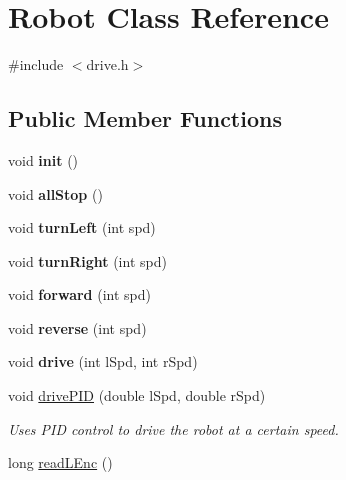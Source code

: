\hypertarget{classRobot}{}\section{Robot Class Reference}
\label{classRobot}


{\ttfamily \#include $<$drive.\+h$>$}

\subsection*{Public Member Functions}
\begin{DoxyCompactItemize}
\item 
\mbox{\label{classRobot_a990e86a39cb249629a0985e71211fa2e}} 
void {\bfseries init} ()
\item 
\mbox{\label{classRobot_a5b1079b77286f963c509b5faa6eb086e}} 
void {\bfseries all\+Stop} ()
\item 
\mbox{\label{classRobot_ae98f6f49a4cbe9a2d3741d22483dea65}} 
void {\bfseries turn\+Left} (int spd)
\item 
\mbox{\label{classRobot_ab9641c762bcded8d42b44d54b4a88796}} 
void {\bfseries turn\+Right} (int spd)
\item 
\mbox{\label{classRobot_a592f08d965facad4153cc6dafc0dc2c5}} 
void {\bfseries forward} (int spd)
\item 
\mbox{\label{classRobot_a620dfa100c49bdcc9adea47f74c88a43}} 
void {\bfseries reverse} (int spd)
\item 
\mbox{\label{classRobot_a872c305b49b0733696a5348e2c8e41c7}} 
void {\bfseries drive} (int l\+Spd, int r\+Spd)
\item 
void \hyperlink{classRobot_a88211ed70c106b8b0c1c0edec49c87a4}{drive\+P\+ID} (double l\+Spd, double r\+Spd)
\begin{DoxyCompactList}\small\item\em Uses P\+ID control to drive the robot at a certain speed. \end{DoxyCompactList}\item 
long \hyperlink{classRobot_ab85e483abd6bb9eb1a3822b44f66aa35}{read\+L\+Enc} ()
\item 

\end{DoxyCompactItemize}
